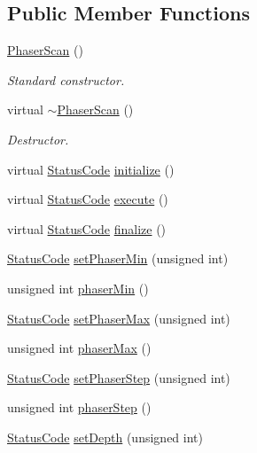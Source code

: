 \subsection*{Public Member Functions}
\begin{DoxyCompactItemize}
\item 
\hyperlink{classPhaserScan_afba6f21affa3e014fe4019dfd9664672}{PhaserScan} ()
\begin{DoxyCompactList}\small\item\em Standard constructor. \item\end{DoxyCompactList}\item 
virtual \hyperlink{classPhaserScan_a861dfecc0610514a146c300a7458bad5}{$\sim$PhaserScan} ()
\begin{DoxyCompactList}\small\item\em Destructor. \item\end{DoxyCompactList}\item 
virtual \hyperlink{classStatusCode}{StatusCode} \hyperlink{classPhaserScan_aeb0dccb02754b11c19719962f7c43fb8}{initialize} ()
\item 
virtual \hyperlink{classStatusCode}{StatusCode} \hyperlink{classPhaserScan_abf8e9639bcbbd23ec1a9a8e04319d9d1}{execute} ()
\item 
virtual \hyperlink{classStatusCode}{StatusCode} \hyperlink{classPhaserScan_a505bd8dc2961fd220f1624cd949a266e}{finalize} ()
\item 
\hyperlink{classStatusCode}{StatusCode} \hyperlink{classPhaserScan_abc98adb04157f08d1c1ba99eee527a37}{setPhaserMin} (unsigned int)
\item 
unsigned int \hyperlink{classPhaserScan_ab24e5fc6e36639ce31faf430ca87afc9}{phaserMin} ()
\item 
\hyperlink{classStatusCode}{StatusCode} \hyperlink{classPhaserScan_ad968ae47c77c7813caf69cc22ff40559}{setPhaserMax} (unsigned int)
\item 
unsigned int \hyperlink{classPhaserScan_a2cccb1c5b687c5cdf934dd3eb11a73ad}{phaserMax} ()
\item 
\hyperlink{classStatusCode}{StatusCode} \hyperlink{classPhaserScan_a99ff5030b4e551437796c5614f92fffd}{setPhaserStep} (unsigned int)
\item 
unsigned int \hyperlink{classPhaserScan_a8bebde600274e342a78783e49917b64d}{phaserStep} ()
\item 
\hyperlink{classStatusCode}{StatusCode} \hyperlink{classPhaserScan_a182d5a23019a62c3c3ad3a03f5187036}{setDepth} (unsigned int)

\end{DoxyCompactItemize}
